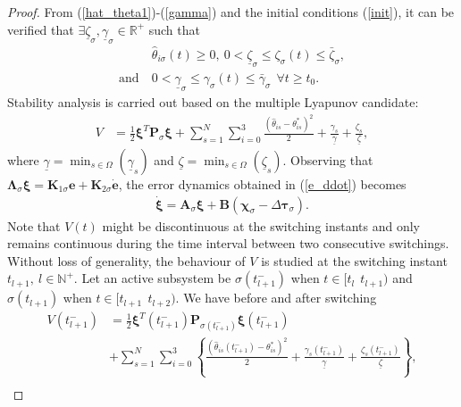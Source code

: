 \documentclass[AMA,STIX1COL,sort, compress]{WileyNJD-v2}
\begin{document}
\begin{proof}
From (\ref{hat_theta1})-(\ref{gamma}) and the initial conditions (\ref{init}), it can be verified that %
$\exists \underline{\zeta}_{\sigma}, \underline{\gamma}_{\sigma} \in \mathbb{R}^{+}$ such that
\begin{align}
&\hat{\theta}_{i\sigma} (t) \geq 0,~ 0<\underline{\zeta}_{\sigma} \leq \zeta_{ \sigma}(t) \leq \bar{\zeta}_{\sigma},\nonumber\\
\text{and}~&0<\underline{\gamma}_{\sigma} \leq \gamma_{ \sigma}(t) \leq \bar{\gamma}_{\sigma}~~\forall t\geq t_0. \label{low_bound}
\end{align}
	Stability analysis is carried out based on the multiple Lyapunov candidate:
	\begin{align}
	V& = \frac{1}{2} \boldsymbol{\xi}^T \mathbf{P}_{\sigma} \boldsymbol{\xi}  + \sum_{s=1}^{N} \sum_{i=0}^{3} \frac{(\hat{\theta}_{is} -{\theta}_{is}^{*})^2}{2} + \frac{\gamma_{s}}{\underline{\gamma}} + \frac{\zeta_{s}}{\underline{\zeta}} , \label{lyap}
	\end{align}
	where $\underline{\gamma}=\min_{s \in \Omega}( \underline{\gamma}_s )$ and $ \underline{\zeta}=\min_{s \in \Omega}( \underline{\zeta}_s )$. Observing that $\boldsymbol{\Lambda}_{\sigma} \boldsymbol{ \xi} =  \mathbf K_{1\sigma} \mathbf{e} + \mathbf K_{2\sigma} \dot{\mathbf e}$, the error dynamics obtained in (\ref{e_ddot}) becomes
	\begin{align}
	\dot{\boldsymbol \xi} = \mathbf{A}_{\sigma} \boldsymbol \xi + \mathbf{B} \left(\boldsymbol \chi_{\sigma} - \Delta \boldsymbol \tau_{\sigma}\right).  \label{error_dyn}
	\end{align}
	Note that $V(t)$ might be discontinuous at the switching instants and only remains continuous during the time interval between two consecutive switchings. Without loss of generality, the behaviour of $V$ is studied at the switching instant $t_{l+1},~ l \in \mathbb{N}^{+}$. Let an active subsystem be ${\sigma({t_{l+1}^{-}})}$ when $t \in [t_l~~t_{l+1})$ and ${\sigma({t_{l+1}})}$ when $t \in [t_{l+1}~~t_{l+2})$. We have before and after switching
	\begin{align*}
	V({t_{l+1}^{-}}) &= \frac{1}{2}\boldsymbol{\xi}^T({t_{l+1}^{-}}) \mathbf{P}_{\sigma({t_{l+1}^{-}})} \boldsymbol{\xi}({t_{l+1}^{-}})  \nonumber\\
	& +  \sum_{s=1}^{N} \sum_{i=0}^{3} \left \lbrace \frac{(\hat{\theta}_{is}({t_{l+1}^{-}}) -{\theta}_{is}^{*})^2}{2} + \frac{ \gamma_{s}({t_{l+1}^{-}})}{ \underline{\gamma}}+ \frac{\zeta_{s}({t_{l+1}^{-}})}{ \underline{\zeta} } \right \rbrace ,\\

\end{align*}
\end{proof}
\end{document}
